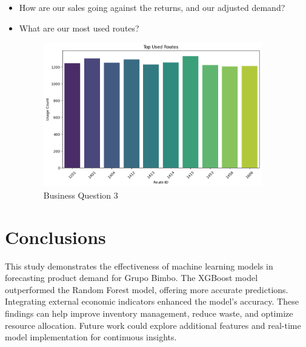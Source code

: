 \documentclass{article}
\begin{document}
\begin{itemize}
    \item How are our sales going against the returns, and our adjusted demand?



    \item What are our most used routes?

    \begin{figure}[H] 
        \begin{center}
        \centering
        \includegraphics[width=0.9\textwidth]{images/quest4.png}
        \caption{Business Question 3}
        \end{center}
    \end{figure}

\end{itemize}

\section{Conclusions}
This study demonstrates the effectiveness of machine learning models in forecasting product demand for Grupo Bimbo. The XGBoost model outperformed the Random Forest model, offering more accurate predictions. Integrating external economic indicators enhanced the model's accuracy. These findings can help improve inventory management, reduce waste, and optimize resource allocation. Future work could explore additional features and real-time model implementation for continuous insights.
\end{document}

